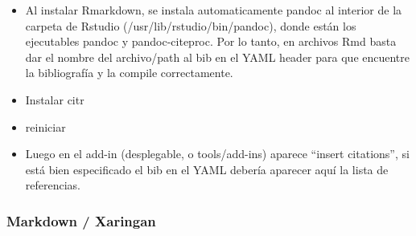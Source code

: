 \documentclass[11pt,]{book}
\providecommand{\tightlist}{%
  \setlength{\itemsep}{0pt}\setlength{\parskip}{0pt}}
\begin{document}
\begin{itemize}
\begin{itemize}
    \begin{itemize}
    \tightlist
    \item
      Al instalar Rmarkdown, se instala automaticamente pandoc al interior de la carpeta de Rstudio (/usr/lib/rstudio/bin/pandoc), donde están los ejecutables pandoc y pandoc-citeproc. Por lo tanto, en archivos Rmd basta dar el nombre del archivo/path al bib en el YAML header para que encuentre la bibliografía y la compile correctamente.
    \item
      Instalar citr
    \item
      reiniciar
    \item
      Luego en el add-in (desplegable, o tools/add-ins) aparece ``insert citations'', si está bien especificado el bib en el YAML debería aparecer aquí la lista de referencias.
    \end{itemize}
  \end{itemize}
\end{itemize}

\hypertarget{markdown-xaringan}{%
\subsubsection{Markdown / Xaringan}\label{markdown-xaringan}}
\end{document}
